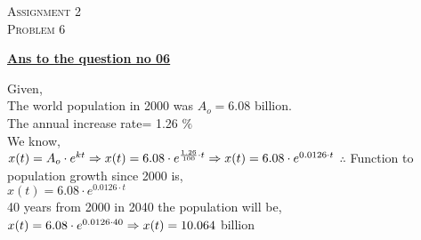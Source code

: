 \documentclass{article}
\begin{document}
\begin{newpage}
\begin{flushright}
    \textsc{Assignment 2}\\
    \textsc{Problem 6}\\
    [0.5 cm]
    \end{flushright}
\begin{center}
  \textbf{\Large \underline {Ans to the question no 06}}\\
  [0.5 cm]
\end{center}
\Large {Given, \\[3mm]
The world population in 2000 was $A_{o}= 6.08$ billion.\\[3mm]
The annual increase rate= 1.26 $\%$\\[3mm]
We know,\\[3mm]
$x(t)= A_{o}\cdot e^{kt}\\[3mm]
\Rightarrow x(t)= 6.08 \cdot e^{\frac{1.26}{100}\cdot t}\\[3mm]
\Rightarrow x(t)= 6.08 \cdot e^{0.0126\cdot t}\\[5mm]$
$\therefore$ Function to population growth since 2000 is,\\[3mm]
$x(t)= 6.08 \cdot e^{0.0126\cdot t}$\\[5mm]
40 years from 2000 in 2040 the population will be,\\[3mm]
$x(t)= 6.08 \cdot e^{0.0126\cdot 40}\\[3mm]
\Rightarrow x(t)= 10.064$ billion\\[3mm]}
\end{newpage}
\end{document}

